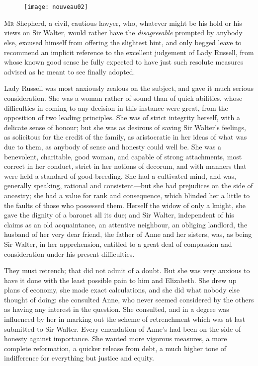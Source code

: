 \chapter[Chapter \thechapter]{}

\begin{figure}[t!]
\centering
\texttt{[image: nouveau02]}
\end{figure}

\lettrine[lines=4,lraise=0.3]{M}{r} Shepherd, a civil, cautious lawyer, who, whatever might be his hold or his views on Sir Walter, would rather have the \textit{disagreeable} prompted by anybody else, excused himself from offering the slightest hint, and only begged leave to recommend an implicit reference to the excellent judgement of Lady Russell, from whose known good sense he fully expected to have just such resolute measures advised as he meant to see finally adopted.

Lady Russell was most anxiously zealous on the subject, and gave it much serious consideration. She was a woman rather of sound than of quick abilities, whose difficulties in coming to any decision in this instance were great, from the opposition of two leading principles. She was of strict integrity herself, with a delicate sense of honour; but she was as desirous of saving Sir Walter's feelings, as solicitous for the credit of the family, as aristocratic in her ideas of what was due to them, as anybody of sense and honesty could well be. She was a benevolent, charitable, good woman, and capable of strong attachments, most correct in her conduct, strict in her notions of decorum, and with manners that were held a standard of good-breeding. She had a cultivated mind, and was, generally speaking, rational and consistent—but she had prejudices on the side of ancestry; she had a value for rank and consequence, which blinded her a little to the faults of those who possessed them. Herself the widow of only a knight, she gave the dignity of a baronet all its due; and Sir Walter, independent of his claims as an old acquaintance, an attentive neighbour, an obliging landlord, the husband of her very dear friend, the father of Anne and her sisters, was, as being Sir Walter, in her apprehension, entitled to a great deal of compassion and consideration under his present difficulties.

They must retrench; that did not admit of a doubt. But she was very anxious to have it done with the least possible pain to him and Elizabeth. She drew up plans of economy, she made exact calculations, and she did what nobody else thought of doing: she consulted Anne, who never seemed considered by the others as having any interest in the question. She consulted, and in a degree was influenced by her in marking out the scheme of retrenchment which was at last submitted to Sir Walter. Every emendation of Anne's had been on the side of honesty against importance. She wanted more vigorous measures, a more complete reformation, a quicker release from debt, a much higher tone of indifference for everything but justice and equity.

